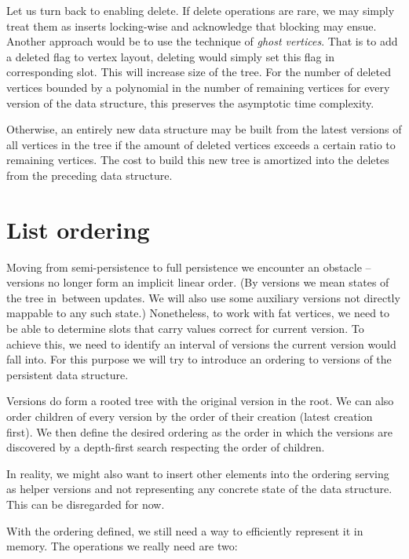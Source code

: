 Let us turn back to enabling delete. If delete operations are rare, we may simply treat them as inserts locking-wise and acknowledge that blocking may ensue. Another approach would be to use the technique of \textit{ghost vertices}. That is to add a deleted flag to vertex layout, deleting would simply set this flag in corresponding slot. This will increase size of the tree. For the number of deleted vertices bounded by a polynomial in the number of remaining vertices for every version of the data structure, this preserves the asymptotic time complexity. 

Otherwise, an entirely new data structure may be built from the latest versions of all vertices in the tree if the amount of deleted vertices exceeds a certain ratio to remaining vertices. The cost to build this new tree is amortized into the deletes from the preceding data structure.



\section{List ordering}

Moving from semi-persistence to full persistence we encounter an obstacle -- versions no longer form an implicit linear order. (By versions we mean states of the tree in~between updates. We will also use some auxiliary versions not directly mappable to any such state.) Nonetheless, to work with fat vertices, we need to be able to determine slots that carry values correct for current version. To achieve this, we need to identify an interval of versions the current version would fall into. For this purpose we will try to introduce an ordering to versions of the persistent data structure.

Versions do form a rooted tree with the original version in the root. We can also order children of every version by the order of their creation (latest creation first). We then define the desired ordering as the order in which the versions are discovered by a depth-first search respecting the order of children. %

In reality, we might also want to insert other elements into the ordering serving as helper versions and not representing any concrete state of the data structure. This can be disregarded for now.

With the ordering defined, we still need a way to efficiently represent it in memory. The operations we really need are two:

